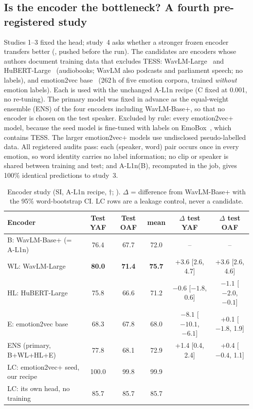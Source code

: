 \subsection{Is the encoder the bottleneck? A fourth pre-registered study}\label{sec:backbones}
Studies 1--3 fixed the head; study~4 asks whether a stronger frozen encoder transfers better (, pushed before the run).
The candidates are encoders whose authors document training data that excludes TESS: WavLM-Large~\cite{wavlm} and HuBERT-Large~\cite{hubert} (audiobooks; WavLM also podcasts and parliament speech; no labels), and emotion2vec base~\cite{emotion2vec} (262\,h of five emotion corpora, trained \emph{without} emotion labels).
Each is used with the unchanged A-L1n recipe (C fixed at 0.001, no re-tuning).
The primary model was fixed in advance as the equal-weight ensemble (ENS) of the four encoders including WavLM-Base+, so that no encoder is chosen on the test speaker.
Excluded by rule: every emotion2vec+ model, because the seed model is fine-tuned with labels on EmoBox~\cite{emobox}, which contains TESS. The larger emotion2vec+ models use undisclosed pseudo-labelled data.
All registered audits pass: each (speaker, word) pair occurs once in every emotion, so word identity carries no label information; no clip or speaker is shared between training and test; and A-L1n(B), recomputed in the job, gives 100\% identical predictions to study~3.
\begin{table}[H]\centering\small
\caption[Study 4: frozen speech encoders]{Encoder study (SI, A-L1n recipe, $\dagger$; ). $\Delta$ = difference from WavLM-Base+ with the 95\% word-bootstrap CI. LC rows are a leakage control, never a candidate.}\label{tab:backbones}
\begin{tabular}{@{}lccccc@{}}\toprule
Encoder & Test YAF & Test OAF & mean & $\Delta$ test YAF & $\Delta$ test OAF\\\midrule
B: WavLM-Base+ (= A-L1n) & 76.4 & 67.7 & 72.0 & -- & --\\
WL: WavLM-Large & \textbf{80.0} & \textbf{71.4} & \textbf{75.7} & +3.6 [2.6, 4.7] & +3.6 [2.6, 4.6]\\
HL: HuBERT-Large & 75.8 & 66.6 & 71.2 & $-0.6$ [$-1.8$, 0.6] & $-1.1$ [$-2.0$, $-0.1$]\\
E: emotion2vec base & 68.3 & 67.8 & 68.0 & $-8.1$ [$-10.1$, $-6.1$] & +0.1 [$-1.8$, 1.9]\\
ENS (primary, B+WL+HL+E) & 77.8 & 68.1 & 72.9 & +1.4 [0.4, 2.4] & +0.4 [$-0.4$, 1.1]\\\midrule
LC: emotion2vec+ seed, our recipe & 100.0 & 99.8 & 99.9 & & \\
LC: its own head, no training & 85.7 & 85.7 & 85.7 & & \\\bottomrule
\end{tabular}\end{table}
